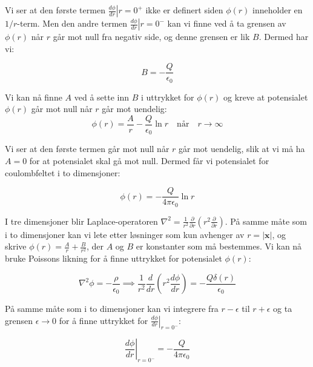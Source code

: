 Vi ser at den første termen $\left.\frac{d\phi}{dr}\right|{r=0^+}$ ikke er definert siden $\phi(r)$ inneholder en $1/r$-term. Men den andre termen $\left.\frac{d\phi}{dr}\right|{r=0^-}$ kan vi finne ved å ta grensen av $\phi(r)$ når $r$ går mot null fra negativ side, og denne grensen er lik $B$. Dermed har vi:

\begin{equation*}
B = -\frac{Q}{\epsilon_0}
\end{equation*}

Vi kan nå finne $A$ ved å sette inn $B$ i uttrykket for $\phi(r)$ og kreve at potensialet $\phi(r)$ går mot null når $r$ går mot uendelig:
\begin{equation*}
    \phi(r) = \frac{A}{r} - \frac{Q}{\epsilon_0}\ln r \quad \text{når} \quad r \rightarrow \infty
\end{equation*}
    
Vi ser at den første termen går mot null når $r$ går mot uendelig, slik at vi må ha $A=0$ for at potensialet skal gå mot null. Dermed får vi potensialet for coulombfeltet i to dimensjoner:
    
 \begin{equation*}
    \phi(r) = -\frac{Q}{4\pi\epsilon_0}\ln r
\end{equation*}
    
I tre dimensjoner blir Laplace-operatoren $\nabla^2 = \frac{1}{r^2}\frac{\partial}{\partial r}\left(r^2\frac{\partial}{\partial r}\right)$. På samme måte som i to dimensjoner kan vi lete etter løsninger som kun avhenger av $r=|\mathbf{x}|$, og skrive $\phi(r) = \frac{A}{r} + \frac{B}{r^2}$, der $A$ og $B$ er konstanter som må bestemmes. Vi kan nå bruke Poissons likning for å finne uttrykket for potensialet $\phi(r)$:
    
\begin{equation*}
    \nabla^2 \phi = -\frac{\rho}{\epsilon_0} \implies \frac{1}{r^2}\frac{d}{dr}\left(r^2\frac{d\phi}{dr}\right) = -\frac{Q\delta(r)}{\epsilon_0}
\end{equation*}
    
På samme måte som i to dimensjoner kan vi integrere fra $r-\epsilon$ til $r+\epsilon$ og ta grensen $\epsilon \rightarrow 0$ for å finne uttrykket for $\left.\frac{d\phi}{dr}\right|_{r=0^-}$:
    
\begin{equation*}
    \left.\frac{d\phi}{dr}\right|_{r=0^-} = -\frac{Q}{4\pi\epsilon_0}
\end{equation*}
    
